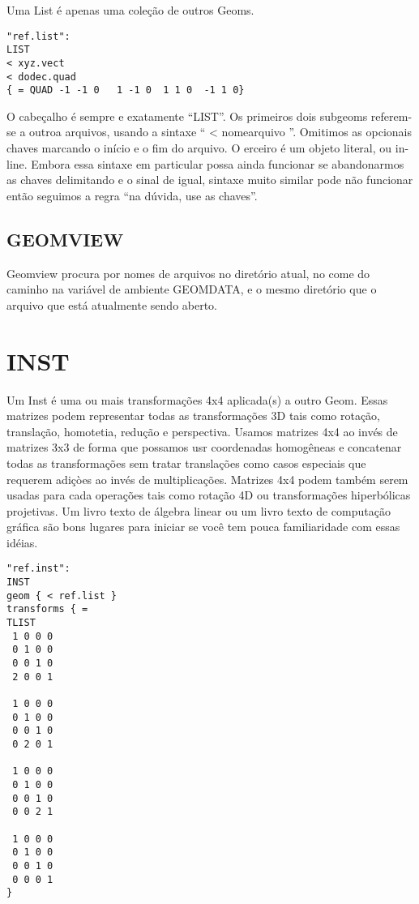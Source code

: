 \documentclass[12pt,a4paper]{book}
\begin{document}
Uma List \'e apenas uma cole\c{c}\~ao de outros Geoms.

\begin{verbatim}
"ref.list":
LIST
< xyz.vect
< dodec.quad
{ = QUAD -1 -1 0   1 -1 0  1 1 0  -1 1 0}
\end{verbatim}

O cabe\c{c}alho \'e sempre e exatamente ``LIST''. Os primeiros dois subgeoms referem-se a
outroa arquivos, usando a sintaxe `` < nomearquivo ''. Omitimos as
opcionais chaves marcando o in\'icio e o fim do arquivo.  O erceiro \'e um objeto literal,
ou in-line. Embora essa sintaxe em particular possa ainda funcionar se abandonarmos
as chaves delimitando e o sinal de igual, sintaxe muito similar pode
n\~ao funcionar ent\~ao seguimos a regra ``na d\'uvida, use as chaves''.

\section{GEOMVIEW}
Geomview procura por nomes de arquivos no diret\'{o}rio atual, no come do caminho na
vari\'avel de ambiente GEOMDATA, e o mesmo diret\'{o}rio que o arquivo
que est\'a atualmente sendo aberto. 

\chapter{INST}

Um Inst \'e uma ou mais transforma\c{c}\~oes 4x4 aplicada(s) a outro Geom.  Essas
matrizes podem representar todas as transforma\c{c}\~oes 3D tais como rota\c{c}\~ao,
transla\c{c}\~ao, homotetia, redu\c{c}\~ao e perspectiva.  Usamos matrizes 4x4
ao inv\'es de matrizes 3x3 de forma que possamos usr coordenadas homog\^eneas e
concatenar todas as transforma\c{c}\~oes sem tratar transla\c{c}\~oes como
casos especiais que requerem adi\c{c}òes ao inv\'es de multiplica\c{c}\~oes.  Matrizes
4x4 podem tamb\'em serem usadas para cada opera\c{c}\~oes tais como rota\c{c}\~ao 4D ou
transforma\c{c}\~oes hiperb\'{o}licas projetivas. Um livro texto de \'algebra linear ou um livro texto de
computa\c{c}\~ao gr\'afica s\~ao bons lugares para iniciar se voc\^e tem pouca familiaridade com
essas id\'eias.
\begin{verbatim}
"ref.inst":
INST
geom { < ref.list }
transforms { = 
TLIST
 1 0 0 0
 0 1 0 0
 0 0 1 0
 2 0 0 1

 1 0 0 0
 0 1 0 0
 0 0 1 0
 0 2 0 1

 1 0 0 0
 0 1 0 0
 0 0 1 0
 0 0 2 1

 1 0 0 0
 0 1 0 0
 0 0 1 0
 0 0 0 1
}
\end{verbatim}
\end{document}
